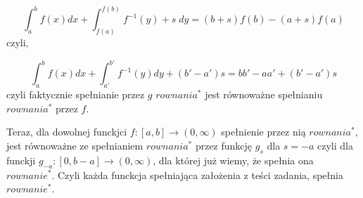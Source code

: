 \documentclass{article}
\def\rw{$rownanie^*$}
\begin{document}
$$\int_a^bf(x)dx + \int_{f(a)}^{f(b)}f^{-1}(y)+s \;dy = (b+s)f(b) - (a+s)f(a)$$
czyli, 

$$\int_a^bf(x)dx + \int_{a'}^{b'}f^{-1}(y)dy + (b'-a')s = bb'-aa' + (b'-a')s$$
czyli faktycznie spełnianie przez $g$ $rownania^*$ jest równoważne spełnianiu $rownania^*$ przez $f$. \newline

Teraz, dla dowolnej funckjci $f:[a,b] \to (0,\infty)$ spełnienie przez nią $rownania^*$, jest równoważne ze spełnianiem $rownania^*$ przez funkcję $g_{s}$ dla $s=-a$ czyli dla funckji $g_{-a}:[0,b-a] \to (0, \infty)$, dla której już wiemy, że spełnia ona \rw. Czyli każda funckcja spełniająca założenia z teści zadania, spełnia \rw.
\end{document}
